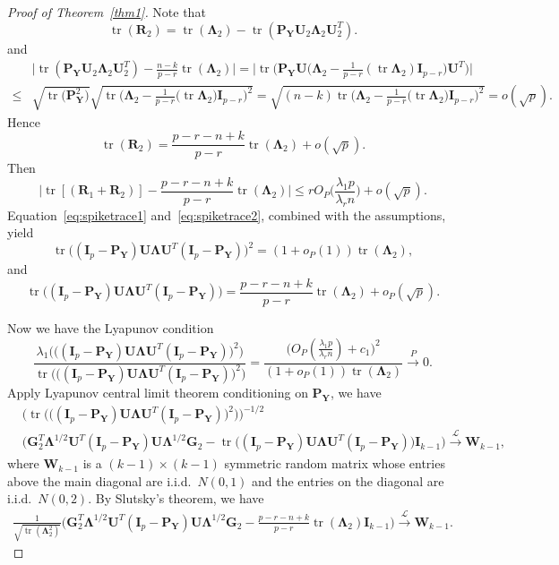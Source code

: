 \documentclass[12pt]{article} %
\DeclareMathOperator{\mytr}{tr}
\newcommand{\bP}{\mathbf{P}}
\newcommand{\bY}{\mathbf{Y}}
\newcommand{\bG}{\mathbf{G}}
\newcommand{\bR}{\mathbf{R}}
\newcommand{\bI}{\mathbf{I}}
\newcommand{\bU}{\mathbf{U}}
\newcommand{\bW}{\mathbf{W}}
\newcommand{\bfsym}[1]{\ensuremath{\boldsymbol{#1}}}
\def\bLambda {\bfsym {\Lambda}}
\theoremstyle{definition}
\begin{document}
\begin{proof}[\textrm{Proof of Theorem~\ref{thm1}}]
Note that
    $$
    \mytr(\bR_2)
    =
    \mytr(\bLambda_2)-\mytr(\bP_{\bY}\bU_2\bLambda_2 \bU_2^T).
    $$ 
and
    $$
    \begin{aligned}
        &
        \big|
    \mytr(\bP_{\bY}\bU_2\bLambda_2 \bU_2^T)
    -\frac{n-k}{p-r}\mytr(\bLambda_2)
    \big|
    =
    \Big|
        \mytr\Big(\bP_{\bY} \bU \big(\bLambda_2-\frac{1}{p-r} (\mytr \bLambda_2) \bI_{p-r} \big) \bU^T\Big)
    \Big|
        \\
        \leq &
        \sqrt{\mytr \big(\bP_{\bY}^2\big)}
        \sqrt{\mytr \Big(\bLambda_2-\frac{1}{p-r}\big(\mytr \bLambda_2\big) \bI_{p-r}\Big)^2}
        =\sqrt{(n-k)\mytr \Big(\bLambda_2-\frac{1}{p-r}\big(\mytr \bLambda_2\big) \bI_{p-r}\Big)^2}
        =o(\sqrt{p}).
    \end{aligned}
    $$
    Hence 
    $$
    \mytr(\bR_2)
    =
    \frac{p-r-n+k}{p-r}\mytr(\bLambda_2)+o(\sqrt{p}).
    $$
    Then
\begin{equation}\label{eq:spiketrace2}
\big| \mytr [(\bR_1+\bR_2)]-\frac{p-r-n+k}{p-r}\mytr(\bLambda_2)\big|\leq 
rO_P\big(\frac{\lambda_1 p}{\lambda_r n}\big)+o(\sqrt{p}).
\end{equation}
Equation~\eqref{eq:spiketrace1} and~\eqref{eq:spiketrace2}, combined with the assumptions, yield
$$
    \mytr\big((\bI_p-\bP_{\bY})\bU\bLambda \bU^T (\bI_p-\bP_{\bY})\big)^2 
 =(1+o_P(1))\mytr(\bLambda_2),
$$
and
$$
\mytr\big((\bI_p-\bP_{\bY})\bU\bLambda \bU^T (\bI_p-\bP_{\bY})\big)
= \frac{p-r-n+k}{p-r}\mytr(\bLambda_2)+o_P(\sqrt{p}).
$$

Now we have the Lyapunov condition
$$
\frac{\lambda_1\Big(\big((\bI_p-\bP_{\bY})\bU\bLambda \bU^T (\bI_p-\bP_{\bY})\big)^2\Big)}{\mytr \Big( \big((\bI_p-\bP_{\bY})\bU\bLambda \bU^T (\bI_p-\bP_{\bY})\big)^2\Big)}
=
\frac{
\big( O_P(\frac{\lambda_1 p}{\lambda_r n})+c_1\big)^2
}{
    (1+o_P(1))\mytr(\bLambda_2)
}
\xrightarrow{P} 0.
$$
Apply Lyapunov central limit theorem conditioning on $\bP_{\bY}$, we have
$$
\begin{aligned}
    &\Big(\mytr \Big( \big((\bI_p-\bP_{\bY})\bU\bLambda \bU^T (\bI_p-\bP_{\bY})\big)^2\Big) \Big)^{-1/2}\\
    &\big( \bG_2^T \bLambda^{1/2}\bU^T (\bI_p-\bP_{\bY})\bU\bLambda^{1/2}\bG_2
    -\mytr\big((\bI_p-\bP_{\bY})\bU\bLambda \bU^T (\bI_p-\bP_{\bY})\big)
     \bI_{k-1} \big)
\xrightarrow{\mathcal{L}} \bW_{k-1},
\end{aligned}
$$
where $\bW_{k-1}$ is a $(k-1)\times(k-1)$ symmetric random matrix whose entries above the main diagonal are i.i.d.\ $N(0,1)$ and the entries on the diagonal are i.i.d.\ $N(0,2)$.
By Slutsky's theorem, we have
$$
\begin{aligned}
    \frac{1}{\sqrt{\mytr(\bLambda_2^2)}}
    \big( \bG_2^T \bLambda^{1/2} \bU^T (\bI_p-\bP_{\bY})\bU\bLambda^{1/2}\bG_2
    -\tfrac{p-r-n+k}{p-r}\mytr(\bLambda_2)\bI_{k-1} \big)
\xrightarrow{\mathcal{L}} \bW_{k-1}.
\end{aligned}
$$




\end{proof}
\end{document}
